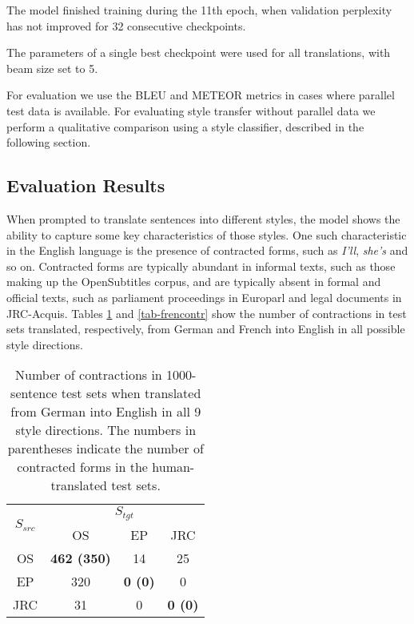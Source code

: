 \documentclass[11pt,a4paper]{article}
\begin{document}
The model finished training during the 11th epoch, when validation perplexity has not improved for 32 consecutive checkpoints.

The parameters of a single best checkpoint were used for all translations, with beam size set to 5.

For evaluation we use the BLEU \citep{bleu} and METEOR \citep{meteor} metrics in cases where parallel test data is available. For evaluating style transfer without parallel data we perform a qualitative comparison using a style classifier, described in the following section.

\subsection{Evaluation Results}

When prompted to translate sentences into different styles, the model shows the ability to capture some key characteristics of those styles. One such characteristic in the English language is the presence of contracted forms, such as \textit{I'll}, \textit{she's} and so on. Contracted forms are typically abundant in informal texts, such as those making up the OpenSubtitles corpus, and are typically absent in formal and official texts, such as parliament proceedings in Europarl and legal documents in JRC-Acquis. Tables \ref{tab-deencontr} and \ref{tab-frencontr} show the number of contractions in test sets translated, respectively, from German and French into English in all possible style directions.

\begin{table}[]
\centering
\begin{tabular}{|c|c|c|c|}
\hline
\multirow{2}{*}{$S_{src}$} & \multicolumn{3}{c|}{$S_{tgt}$}\\
\cline{2-4} 
                      & OS                 & EP             & JRC            \\ \hline
OS                    & \textbf{462 (350)} & 14             & 25             \\ \hline
EP                    & 320                & \textbf{0 (0)} & 0              \\ \hline
JRC                   & 31                 & 0              & \textbf{0 (0)} \\ \hline
\end{tabular}
\caption{\small Number of contractions in 1000-sentence test sets when translated from German into English in all 9 style directions. The numbers in parentheses indicate the number of contracted forms in the human-translated test sets.
      }
      \label{tab-deencontr}
\end{table}
\end{document}
